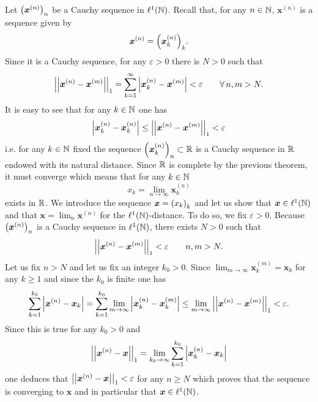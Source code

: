 \documentclass{article}
\begin{document}
\begin{fancyproof}
	Let ${\left(\bm{x}^{(n)}\right)}_{n}$ be a Cauchy sequence in $\ell^{1}(\mathbb{N})$. Recall that, for any $n\in\mathbb{N}$, $\bm{x}^{(n)}$ is a sequence given by
	\begin{equation*}
		\bm{x}^{(n)}={\left(\bm{x}^{(n)}_{k}\right)}_{k}.
	\end{equation*}
	Since it is a Cauchy sequence, for any $\varepsilon>0$ there is $N>0$ such that
	\begin{equation*}
		\left|\left|\bm{x}^{(n)}-\bm{x}^{(m)}\right|\right|_{1}=\sum_{k=1}^{\infty}\left|\bm{x}_{k}^{(n)}-\bm{x}^{(m)}\right|<\varepsilon\qquad\forall\, n,m>N.
	\end{equation*}
	It is easy to see that for any $k\in\mathbb{N}$ one has
	\begin{equation*}
		\left|\bm{x}_{k}^{(n)}-\bm{x}_{k}^{(n)}\right|\leq\left|\left|\bm{x}^{(n)}-\bm{x}^{(m)}\right|\right|_{1}<\varepsilon
	\end{equation*}
	i.e. for any $k\in\mathbb{N}$ fixed the sequence ${\left(\bm{x}^{(n)}_{k}\right)}_{n}\subset\mathbb{R}$ is a Cauchy sequence in $\mathbb{R}$ endowed with its natural distance. Since $\mathbb{R}$ is complete by the previous theorem, it must converge which means that for any $k\in\mathbb{N}$
	\begin{equation*}
		x_{k}=\lim_{n\to\infty}\bm{x}^{(n)}_{k}
	\end{equation*}
	exists in $\mathbb{R}$. We introduce the sequence $\bm{x}={\left({x}_{k}\right)}_{k}$ and let us show that $\bm{x}\in\ell^{1}(\mathbb{N})$ and that $\bm{x}=\lim_{n}\bm{x}^{(n)}$ for the $\ell^{1}(\mathbb{N})$-distance. To do so, we fix $\varepsilon>0$. Because ${\left(\bm{x}^{(n)}\right)}_{n}$ is a Cauchy sequence in $\ell^{1}(\mathbb{N})$, there exists $N>0$ such that
	\begin{equation*}
		\left|\left|\bm{x}^{(n)}-\bm{x}^{(m)}\right|\right|_{1}<\varepsilon\qquad n,m>N.
	\end{equation*}
	Let us fix $n>N$ and let us fix an integer $k_{0}>0$. Since $\lim_{m\to\infty}\bm{x}^(m)_{k}=\bm{x}_{k}$ for any $k\geq 1$ and since the $k_{0}$ is finite one has
	\begin{equation*}
		\sum_{k=1}^{k_{0}}\left|\bm{x}^{(n)}-\bm{x}_{k}\right|=\sum_{k=1}^{k_{0}}\lim_{m\to\infty}\left|\bm{x}^{(n)}_{k}-\bm{x}_{k}^{(m)}\right|\leq\lim_{m\to\infty}\left|\left|\bm{x}^{(n)}-\bm{x}^{(m)}\right|\right|_{1}<\varepsilon.
	\end{equation*}
	Since this is true for any $k_{0}>0$ and 
	\begin{equation*}
		\left|\left|\bm{x}^{(n)}-\bm{x}\right|\right|_{1}=\lim_{k_{0}\to\infty}\sum_{k=1}^{k_{0}}\left|\bm{x}^{(n)}_{k}-\bm{x}_{k}\right|
	\end{equation*}
	one deduces that $\left|\left|\bm{x}^{(n)}-\bm{x}\right|\right|_{1}<\varepsilon$ for any $n\geq N$ which proves that the sequence is converging to $\bm{x}$ and in particular that $\bm{x}\in\ell^{1}(\mathbb{N})$.
\end{fancyproof}
\end{document}
